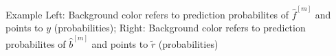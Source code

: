 \begin{frame}{Example}
Left: Background color refers to prediction probabilites of $\hat{f}^{[m]}$ and points to $y$ (probabilities);  
Right: Background color refers to prediction probabilites of $\hat{b}^{[m]}$ and points to $\tilde{r}$ (probabilities) 

\vfill




\end{frame}
